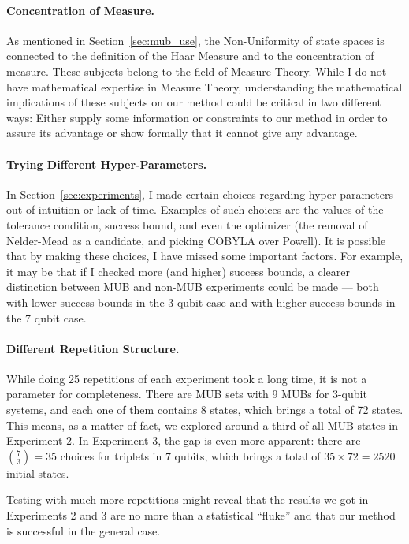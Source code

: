 \documentclass[a4paper,12pt]{article}
\begin{document}
\paragraph*{Concentration of Measure.}
As mentioned in Section~\ref{sec:mub_use}, the Non-Uniformity of state spaces is connected to the definition of the Haar Measure and to the concentration of measure.
These subjects belong to the field of Measure Theory.
While I do not have mathematical expertise in Measure Theory, understanding the mathematical implications of these subjects on our method could be critical in two different ways: Either supply some information or constraints to our method in order to assure its advantage or show formally that it cannot give any advantage.

\paragraph*{Trying Different Hyper-Parameters.}
In Section~\ref{sec:experiments}, I made certain choices regarding hyper-parameters out of intuition or lack of time.
Examples of such choices are the values of the tolerance condition, success bound, and even the optimizer (the removal of Nelder-Mead as a candidate, and picking COBYLA over Powell).
It is possible that by making these choices, I have missed some important factors.
For example, it may be that if I checked more (and higher) success bounds, a clearer distinction between MUB and non-MUB experiments could be made --- both with lower success bounds in the 3 qubit case and with higher success bounds in the 7 qubit case.

\paragraph*{Different Repetition Structure.}
While doing 25 repetitions of each experiment took a long time, it is not a parameter for completeness.
There are MUB sets with 9 MUBs for 3-qubit systems, and each one of them contains 8 states, which brings a total of 72 states.
This means, as a matter of fact, we explored around a third of all MUB states in Experiment 2.
In Experiment 3, the gap is even more apparent: there are ${7 \choose 3} = 35$ choices for triplets in 7 qubits, which brings a total of $35 \times 72 = 2520$ initial states.

Testing with much more repetitions might reveal that the results we got in Experiments 2 and 3 are no more than a statistical ``fluke'' and that our method is successful in the general case.
\end{document}
